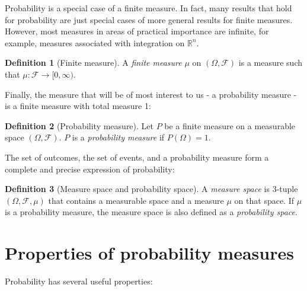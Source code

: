 \documentclass{book}
\theoremstyle{plain}%
\theoremstyle{definition}
\newtheorem{definition}{Definition}[section]
\newlength{\arrow}
\begin{document}
Probability is a special case of a finite measure. In fact, many results that hold for probability are just special cases of more general results for finite measures. However, most measures in areas of practical importance are infinite, for example, measures associated with integration on $\mathbb{R}^n$.

\begin{definition}[Finite measure]
A \emph{finite measure} $\mu$ on $(\Omega, \mathcal{F})$ is a measure such that $\mu: \mathcal{F} \rightarrow [0, \infty)$.
\end{definition}

Finally, the measure that will be of most interest to us - a probability measure - is a finite measure with total measure 1:

\begin{definition}[Probability measure]
Let $P$ be a finite measure on a measurable space $(\Omega, \mathcal{F})$.  $P$ is a \emph{probability measure} if $P(\Omega) = 1$.
\end{definition}

The set of outcomes, the set of events, and a probability measure form a complete and precise expression of probability:

\begin{definition}[Measure space and probability space]
A \emph{measure space} is 3-tuple $(\Omega, \mathcal{F}, \mu)$ that contains a measurable space and a measure $\mu$ on that space. If $\mu$ is a probability measure, the measure space is also defined as a \emph{probability space}.
\end{definition}

\section{Properties of probability measures}

Probability has several useful properties:
\end{document}
